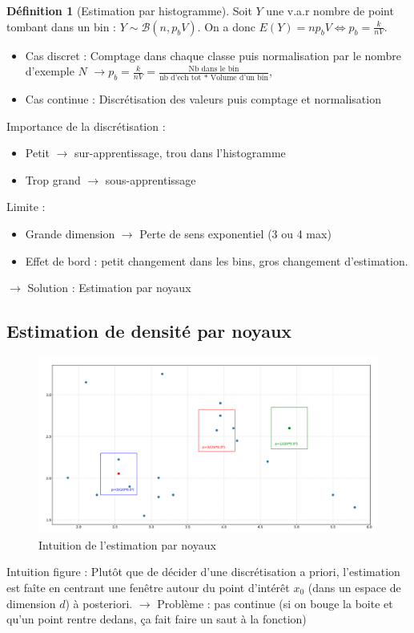 \documentclass{article}
\theoremstyle{plain}%
\theoremstyle{definition}
\newtheorem{defn}{Définition}[section]
\theoremstyle{remark}
\begin{document}
\begin{defn}[Estimation par histogramme]
    Soit $ Y $ une v.a.r nombre de point tombant dans un bin : $ Y \sim \mathcal{B}(n, p_b V)$. On a donc $ E(Y) = n p_b V \Leftrightarrow p_b = \frac{k}{nV} $. 
    \begin{itemize}
        \item Cas discret : Comptage dans chaque classe puis normalisation par le nombre d'exemple $ N $ $\rightarrow p_b = \frac{k}{nV} = \frac{\text{Nb dans le bin}}{\text{nb d'ech tot }*\text{ Volume d'un bin}}$,
        \item Cas continue : Discrétisation des valeurs puis comptage et normalisation
    \end{itemize}
\end{defn}
Importance de la discrétisation : \begin{itemize}
    \item Petit $\rightarrow$ sur-apprentissage, trou dans l'histogramme
    \item Trop grand $\rightarrow$ sous-apprentissage
\end{itemize}
Limite : \begin{itemize}
    \item Grande dimension $\rightarrow$ Perte de sens exponentiel (3 ou 4 max)
    \item Effet de bord : petit changement dans les bins, gros changement d'estimation. 
\end{itemize}
$\rightarrow$ Solution : Estimation par noyaux

\subsection{Estimation de densité par noyaux}
\begin{figure}[htbp]
    \centering
    \includegraphics*[width=\textwidth]{./fig1.png}
    \caption{Intuition de l'estimation par noyaux}
    \label{intuitionnoyaux}
\end{figure}
Intuition figure \cite*{intuitionnoyaux} : Plutôt que de décider d'une discrétisation a priori, l'estimation est faîte en centrant une fenêtre autour du point d'intérêt $ x_0 $ (dans un espace de dimension $d$) à posteriori. $\rightarrow$ Problème : pas continue (si on bouge la boite et qu'un point rentre dedans, ça fait faire un saut à la fonction)
\end{document}
